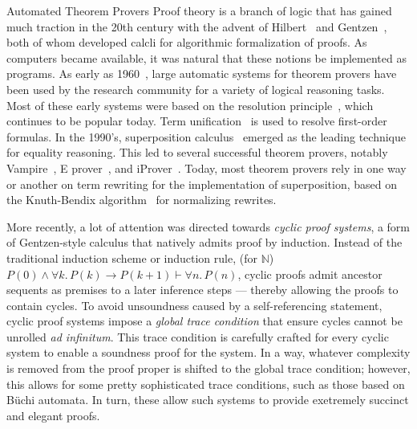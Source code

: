 \begin{paragraph}{Automated Theorem Provers}
Proof theory is a branch of logic that has gained much traction in the 20th century with the advent of Hilbert~\cite{Book1928:Hilbert} and Gentzen~\cite{j1935:Gentzen},
both of whom developed calcli for algorithmic formalization of proofs.
As computers became available, it was natural that these notions be implemented as programs.
As early as 1960~\cite{Wiley1960:Wang,Wiley1961:Wang}, large automatic systems for theorem provers have been used by the research community for a variety of logical reasoning tasks.
Most of these early systems were based on the resolution principle~\cite{JACM1965:Robinson}, which continues to be popular today.
Term unification~\cite{IJCM1965:Robinson} is used to resolve first-order formulas.
In the 1990's, superposition calculus~\cite{LPAR1992:Bachmair} emerged as the leading technique for equality reasoning.
This led to several successful theorem provers, notably Vampire~\cite{JAR1995:Voronkov,CAV2013:Kovacs}, E prover~\cite{AIC2002:Schulz}, and iProver~\cite{CADE2008:Korovin}.
Today, most theorem provers rely in one way or another on term rewriting for the implementation of superposition, based on the Knuth-Bendix algorithm~\cite{AR1983:Knuth} for normalizing rewrites.

More recently, a lot of attention was directed towards \emph{cyclic proof systems}, a form of Gentzen-style calculus that natively admits proof by induction.
Instead of the traditional induction scheme or induction rule, \eg (for $\mathbb{N}$) $P(0)\land \forall k.\,P(k)\to P(k+1) \vdash \forall n.\,P(n)$,
cyclic proofs admit ancestor sequents as premises to a later inference steps --- thereby allowing the proofs to contain cycles.
To avoid unsoundness caused by a self-referencing statement, cyclic proof systems impose a \emph{global trace condition} that ensure cycles cannot be unrolled \textit{ad infinitum}.
This trace condition is carefully crafted for every cyclic system to enable a soundness proof for the system.
In a way, whatever complexity is removed from the proof proper is shifted to the global trace condition;
however, this allows for some pretty sophisticated trace conditions, such as those based on B\"uchi automata.
In turn, these allow such systems to provide exetremely succinct and elegant proofs.
\end{paragraph}

